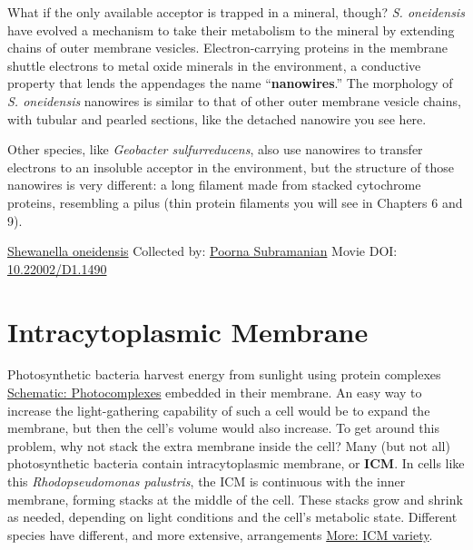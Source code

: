 \documentclass[]{tufte-book}
\begin{document}
What if the only available acceptor is trapped in a mineral, though? \emph{S. oneidensis} have evolved a mechanism to take their metabolism to the mineral by extending chains of outer membrane vesicles. Electron-carrying proteins in the membrane shuttle electrons to metal oxide minerals in the environment, a conductive property that lends the appendages the name ``\textbf{nanowires}.'' The morphology of \emph{S. oneidensis} nanowires is similar to that of other outer membrane vesicle chains, with tubular and pearled sections, like the detached nanowire you see here.

Other species, like \emph{Geobacter sulfurreducens}, also use nanowires to transfer electrons to an insoluble acceptor in the environment, but the structure of those nanowires is very different: a long filament made from stacked cytochrome proteins, resembling a pilus (thin protein filaments you will see in Chapters 6 and 9).



\hypertarget{htmlwidget-6bf563ccff85e9527450}{}

\label{fig:4-2}\protect\hyperlink{tree}{Shewanella oneidensis} Collected by: \protect\hyperlink{poorna_subramanian}{Poorna Subramanian} Movie DOI: \href{https://doi.org/10.22002/D1.1490}{10.22002/D1.1490}

\hypertarget{intracytoplasmic-membrane}{%
\section{Intracytoplasmic Membrane}\label{intracytoplasmic-membrane}}

Photosynthetic bacteria harvest energy from sunlight using protein complexes \protect\hyperlink{Photocomplexes}{Schematic: Photocomplexes} embedded in their membrane. An easy way to increase the light-gathering capability of such a cell would be to expand the membrane, but then the cell's volume would also increase. To get around this problem, why not stack the extra membrane inside the cell? Many (but not all) photosynthetic bacteria contain intracytoplasmic membrane, or \textbf{ICM}. In cells like this \emph{Rhodopseudomonas palustris}, the ICM is continuous with the inner membrane, forming stacks at the middle of the cell. These stacks grow and shrink as needed, depending on light conditions and the cell's metabolic state. Different species have different, and more extensive, arrangements \protect\hyperlink{ICM_variety}{More: ICM variety}.
\end{document}
